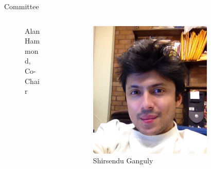 \begin{frame}{Committee}
\begin{columns}[c]
\begin{column}{0.23\textwidth}
\begin{figure}
        \caption{\tiny Alan Hammond,\\ Co-Chair}
    \end{figure}
    \end{column}
    \begin{column}{0.23\textwidth}
    \begin{figure}
        \centering
        \includegraphics[width=\textwidth,clip,trim={0 1cm 0 0cm}]{Figures/intro/shirsendu.jpg}
        \caption{\tiny Shirsendu Ganguly}
    \end{figure}
    \end{column}
    \begin{column}{0.23\textwidth}
    \begin{figure}
        \centering

\end{figure}
\end{column}
\end{columns}
\end{frame}

